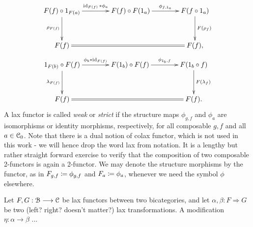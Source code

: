 \begin{defn}
\begin{gather*}
{        }
      \end{gather*}
      \begin{gather*}
        \xymatrix@C+1.5em@R+1em{
          F(f) \circ 1_{F(a)}
            \ar[r]^-{\id_{F(f)} \ast \phi_a}
            \ar[d]_{\rho_{F(f)}}
          &
          F(f) \circ F(1_a)
            \ar[r]^-{\phi_{f,1_a}}
          &
          F(f \circ 1_a)
            \ar[d]^{F(\rho_f)}
          \\
          F(f)
            \ar@{=}[rr]
          &
          &
          F(f),
        }
      \end{gather*}
      \begin{gather*}
        \xymatrix@C+1.5em@R+1em{
          1_{F(b)} \circ F(f)
            \ar[r]^-{\phi_b \ast \id_{F(f)}}
            \ar[d]_{\lambda_{F(f)}}
          &
          F(1_b) \circ F(f)
            \ar[r]^-{\phi_{1_b,f}}
          &
          F(1_b \circ f)
            \ar[d]^{F(\lambda_f)}
          \\
          F(f)
            \ar@{=}[rr]
          &
          &
          F(f).
         }
      \end{gather*}
      A lax functor is called \emph{weak} or \emph{strict} if the structure maps $\phi_{g,f}$ and $\phi_a$ are isomorphisms or identity morphisms, respectively, for all composable $g,f$ and all $a \in \mathcal{C}_0$. 
      Note that there is a dual notion of colax functor, which is not used in this work - we will hence drop the word lax from notation. 
      It is a lengthy but rather straight forward exercise to verify that the composition of two composable 2-functors is again a 2-functor. 
      We may denote the structure morphisms by the functor, as in $F_{g,f} \coloneqq \phi_{g,f}$ and $F_a \coloneqq \phi_a$, whenever we need the symbol $\phi$ elsewhere.
    \end{defn}

    \begin{defn}\label{def_modification}
    Let $F,G: \mathcal{B} \longrightarrow \mathcal{C}$ be lax functors between two bicategories, and let $\alpha,\beta: F \Rightarrow G$ be two (left? right? doesn't matter?) lax transformations. A modification $\eta: \alpha \to \beta$ ...
    \end{defn}

